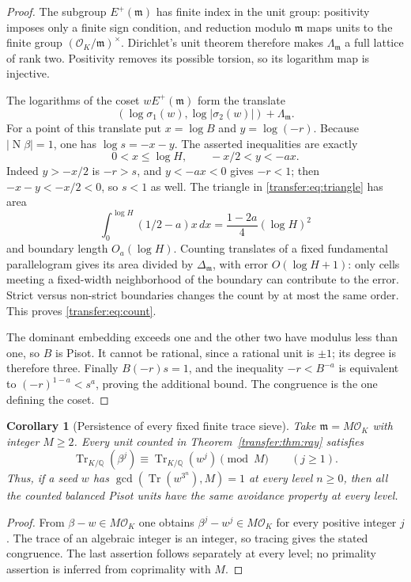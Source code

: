 \documentclass[11pt,a4paper]{article}
\newtheorem{corollary}[theorem]{Corollary}
\theoremstyle{remark}\newtheorem{remark}[theorem]{Remark}
\begin{document}
\begin{proof}
The subgroup $E^+(\mathfrak m)$ has finite index in the unit group:
positivity imposes only a finite sign condition, and reduction modulo
$\mathfrak m$ maps units to the finite group
$(\mathcal O_K/\mathfrak m)^\times$. Dirichlet's unit theorem therefore
makes $\Lambda_{\mathfrak m}$ a full lattice of rank two. Positivity
removes its possible torsion, so its logarithm map is injective.

The logarithms of the coset $wE^+(\mathfrak m)$ form the translate
\[
 (\log\sigma_1(w),\log|\sigma_2(w)|)+\Lambda_{\mathfrak m}.
\]
For a point of this translate put $x=\log B$ and $y=\log(-r)$.
Because $|\operatorname N\beta|=1$, one has $\log s=-x-y$.
The asserted inequalities are exactly
\begin{equation}\label{transfer:eq:triangle}
 0<x\le\log H,\qquad -x/2<y<-ax.
\end{equation}
Indeed $y>-x/2$ is $-r>s$, and $y<-ax<0$ gives $-r<1$;
then $-x-y<-x/2<0$, so $s<1$ as well.
The triangle in \eqref{transfer:eq:triangle} has area
\[
 \int_0^{\log H}(1/2-a)x\,dx
       =\frac{1-2a}{4}(\log H)^2
\]
and boundary length $O_a(\log H)$. Counting translates of a fixed
fundamental parallelogram gives its area divided by
$\Delta_{\mathfrak m}$, with error $O(\log H+1)$: only cells meeting a
fixed-width neighborhood of the boundary can contribute to the error.
Strict versus non-strict boundaries changes the count by at most the
same order. This proves \eqref{transfer:eq:count}.

The dominant embedding exceeds one and the other two have modulus
less than one, so $B$ is Pisot. It cannot be rational, since a rational
unit is $\pm1$; its degree is therefore three. Finally
$B(-r)s=1$, and the inequality $-r<B^{-a}$ is equivalent to
$(-r)^{1-a}<s^a$, proving the additional bound. The congruence is the
one defining the coset.
\end{proof}

\begin{corollary}[Persistence of every fixed finite trace sieve]
\label{transfer:cor:sieve}
Take $\mathfrak m=M\mathcal O_K$ with integer $M\ge2$. Every unit
counted in Theorem~\ref{transfer:thm:ray} satisfies
\[
 \operatorname{Tr}_{K/\mathbb Q}(\beta^j)
 \equiv\operatorname{Tr}_{K/\mathbb Q}(w^j)\pmod M
 \qquad(j\ge1).
\]
Thus, if a seed $w$ has
$\gcd(\operatorname{Tr}(w^{3^n}),M)=1$ at every level $n\ge0$,
then all the counted balanced Pisot units have the same avoidance
property at every level.
\end{corollary}
\begin{proof}
From $\beta-w\in M\mathcal O_K$ one obtains
$\beta^j-w^j\in M\mathcal O_K$ for every positive integer $j$.
The trace of an algebraic integer is an integer, so tracing gives the
stated congruence. The last assertion follows separately at every
level; no primality assertion is inferred from coprimality with $M$.
\end{proof}
\end{document}
